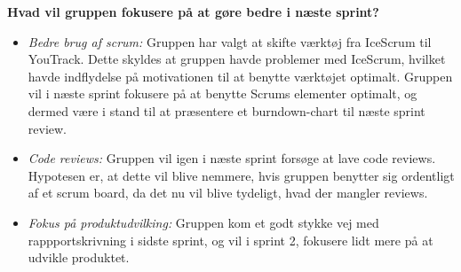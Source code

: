\textbf{Hvad vil gruppen fokusere på at gøre bedre i næste sprint?}
\begin{itemize}
    \item \textit{Bedre brug af scrum:} Gruppen har valgt at skifte værktøj fra IceScrum til YouTrack. Dette skyldes at gruppen havde problemer med IceScrum, hvilket
    havde indflydelse på motivationen til at benytte værktøjet optimalt. Gruppen vil i næste sprint fokusere på at benytte Scrums elementer optimalt, og dermed være i stand
    til at præsentere et burndown-chart til næste sprint review.
    \item \textit{Code reviews:} Gruppen vil igen i næste sprint forsøge at lave code reviews. Hypotesen er, at dette vil blive nemmere, hvis gruppen benytter sig ordentligt 
    af et scrum board, da det nu vil blive tydeligt, hvad der mangler reviews.
    \item \textit{Fokus på produktudvilking:} Gruppen kom et godt stykke vej med rappportskrivning i sidste sprint, og vil i sprint 2, fokusere lidt mere på at udvikle produktet.
\end{itemize}